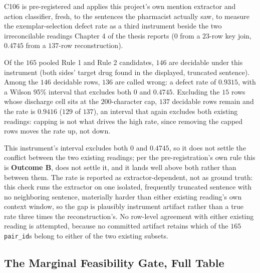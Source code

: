 C106 is pre-registered and applies this project's own mention extractor and action classifier, fresh,
to the sentences the pharmacist actually saw, to measure the exemplar-selection
defect rate as a third instrument beside the two irreconcilable readings
Chapter 4 of the thesis reports ($0$ from a $23$-row key join, $0.4745$ from
a $137$-row reconstruction).

Of the $165$ pooled Rule 1 and Rule 2 candidates, $146$ are decidable under
this instrument (both sides' target drug found in the displayed, truncated
sentence). Among the $146$ decidable rows, $136$ are called wrong: a defect
rate of $0.9315$, with a Wilson 95\% interval that excludes both $0$ and
$0.4745$. Excluding the $15$ rows whose discharge cell sits at the
$200$-character cap, $137$ decidable rows remain and the rate is $0.9416$
($129$ of $137$), an interval that again excludes both existing readings:
capping is not what drives the high rate, since removing
the capped rows moves the rate up, not down.

This instrument's interval excludes both $0$ and $0.4745$, so it does not
settle the conflict between the two existing readings; per the
pre-registration's own rule this is \textbf{Outcome B}, does not settle it,
and it lands well above both rather than between them. The rate is reported
as extractor-dependent, not as ground truth: this check runs the extractor on
one isolated, frequently truncated sentence with no neighboring sentence,
materially harder than either existing reading's own context window, so the
gap is plausibly instrument artifact rather than a true rate three times the
reconstruction's. No row-level agreement with either existing reading is
attempted, because no committed artifact retains which of the $165$
\texttt{pair\_id}s belong to either of the two existing subsets.

\subsection{The Marginal Feasibility Gate, Full Table}
\label{sup:sec:s5-feasgate}


